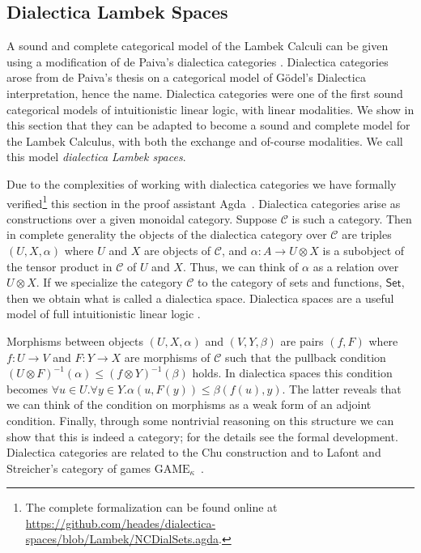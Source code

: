 \documentclass{entcs}
\let\mto\to                     %
\let\to\relax                   %
\newcommand{\to}{\rightarrow}
\newcommand{\cat}[1]{\mathcal{#1}}
\newcommand{\Set}{\mathsf{Set}}
\begin{document}
\subsection{Dialectica Lambek Spaces}
\label{sec:dialectica_lambek_spaces}

A sound and complete categorical model of  the Lambek Calculi
 can be given using a modification of de Paiva's
dialectica categories \cite{depaiva1990}.  Dialectica
categories arose from de Paiva's thesis on a categorical model
of G\"odel's Dialectica interpretation, hence the name.  Dialectica
categories were one of the first sound categorical models of
intuitionistic linear logic, with  linear modalities.  We show in
this section that they can be adapted to become a sound and complete model for the Lambek Calculus, with both the
exchange and of-course modalities. We call this model  \textit{dialectica Lambek spaces}.

Due to the complexities of working
with dialectica categories we have formally verified\footnote{The complete formalization can be
  found online at
  \url{https://github.com/heades/dialectica-spaces/blob/Lambek/NCDialSets.agda}.} this section in
the proof assistant Agda~\cite{bove2009}.
Dialectica categories arise as constructions over a given monoidal
category.  Suppose $\cat{C}$ is such a category.  Then in complete
generality the objects of the dialectica category over $\cat{C}$ are
triples $(U, X, \alpha)$ where $U$ and $X$ are objects of $\cat{C}$,
and $\alpha : A \mto U \otimes X$ is a subobject of the tensor product
in $\cat{C}$ of $U$ and $X$.  Thus, we can think of $\alpha$ as a
relation over $U \otimes X$.  If we specialize the category $\cat{C}$
to the category of sets and functions, $\Set$, then we obtain what is
called a dialectica space. Dialectica spaces are a useful model of
full intuitionistic linear logic \cite{Hyland:1993}.

Morphisms between objects $(U, X, \alpha)$ and $(V, Y, \beta)$ are
pairs $(f, F)$ where $f : U \mto V$ and $F : Y \mto X$ are morphisms
of $\cat{C}$ such that the pullback condition 
$(U \otimes F)^{-1}(\alpha) \leq (f \otimes Y)^{-1}(\beta)$ holds.
In dialectica spaces this condition becomes
$\forall u \in U.\forall y \in Y. \alpha(u , F(y)) \leq \beta(f(u), y)$.
The latter reveals that we can think of the condition on morphisms as
a weak form of an adjoint condition.  Finally, through some nontrivial reasoning
on this structure we can show that this is indeed a category; for the
details see the formal development.  Dialectica categories are related
to the Chu construction \cite{depaiva2007} and to Lafont and Streicher's category of games $\text{GAME}_{\kappa}$~\cite{lafont1991}.
\end{document}

